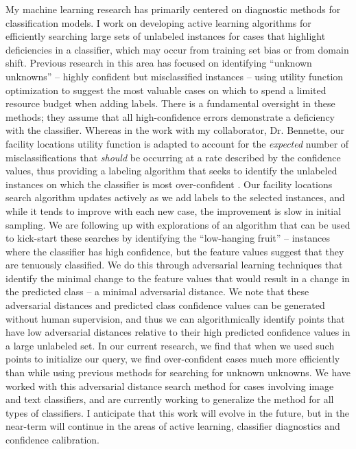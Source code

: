 \documentclass[letterpaper,12pt]{article}\usepackage[]{graphicx}\usepackage[]{color}
\begin{document}
My machine learning research has primarily centered on diagnostic methods for classification models. I work on developing active learning algorithms for efficiently searching large sets of unlabeled instances for cases that highlight deficiencies in a classifier, which may occur from training set bias or from domain shift. Previous research in this area has focused on identifying ``unknown unknowns'' -- highly confident but misclassified instances -- using utility function optimization to suggest the most valuable cases on which to spend a limited resource budget when adding labels. There is a fundamental oversight in these methods; they assume that all high-confidence errors demonstrate a deficiency with the classifier. Whereas in the work with my collaborator, Dr. Bennette, our facility locations utility function is adapted to account for the {\it expected} number of misclassifications that {\it should} be occurring at a rate described by the confidence values, thus providing a labeling algorithm that seeks to identify the unlabeled instances on which the classifier is most over-confident \citep{maurer2018facility}. Our facility locations search algorithm updates actively as we add labels to the selected instances, and while it tends to improve with each new case, the improvement is slow in initial sampling. We are following up with explorations of an algorithm that can be used to kick-start these searches by identifying the ``low-hanging fruit'' -- instances where the classifier has high confidence, but the feature values suggest that they are tenuously classified. We do this through adversarial learning techniques that identify the minimal change to the feature values that would result in a change in the predicted class -- a minimal adversarial distance. We note that these adversarial distances and predicted class confidence values can be generated without human supervision, and thus we can algorithmically identify points that have low adversarial distances relative to their high predicted confidence values in a large unlabeled set. In our current research, we find that when we used such points to initialize our query, we find over-confident cases much more efficiently than while using previous methods for searching for unknown unknowns. We have worked with this adversarial distance search method for cases involving image and text classifiers, and are currently working to generalize the method for all types of classifiers. I anticipate that this work will evolve in the future, but in the near-term will continue in the areas of active learning, classifier diagnostics and confidence calibration. 
\end{document}
